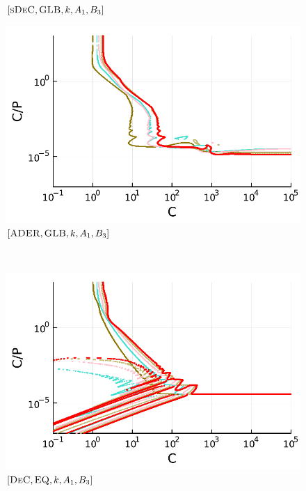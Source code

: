 \begin{figure}
\begin{minipage}[t]{0.32\textwidth}
		\small$[\textsc{sDeC}, \textsc{GLB},k, A_1,B_3]$\par
	\end{minipage}
	\begin{minipage}[t]{0.32\textwidth}
		\centering
		\includegraphics[width=\textwidth]{pdf/pdepics/disp/IMEXADER_gaussLobatto_disp_TMM_2-6_newE.pdf}
		\small$[\textsc{ADER}, \textsc{GLB},k, A_1,B_3]$\par
	\end{minipage}\\
	\begin{minipage}[t]{0.32\textwidth}
		\centering
		\includegraphics[width=\textwidth]{pdf/pdepics/disp/IMEXDeC_equispaced_disp_TMM_2-6_newE.pdf}
		\small$[\textsc{DeC}, \textsc{EQ},k,A_1,B_3]$\par
	\end{minipage}
	\begin{minipage}[t]{0.32\textwidth}
		\centering

\end{minipage}
\end{figure}
